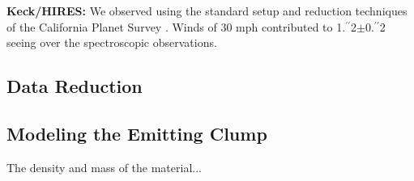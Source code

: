 \documentclass{nature3}
\newcommand{\farcs}{\mbox{\ensuremath{.\!\!^{\prime\prime}}}}%
\begin{document}
\begin{methods}
{\bf Keck/HIRES:}
We observed using the standard setup and reduction techniques of the
California Planet Survey \cite{Howard2010}.
Winds of 30 mph contributed to
1\farcs2$\pm$0\farcs2 seeing over the spectroscopic observations.  


\subsection{Data Reduction}

\subsection{Modeling the Emitting Clump}
\label{subsec:model}

The density and mass of the material...





\end{methods}
\end{document}
